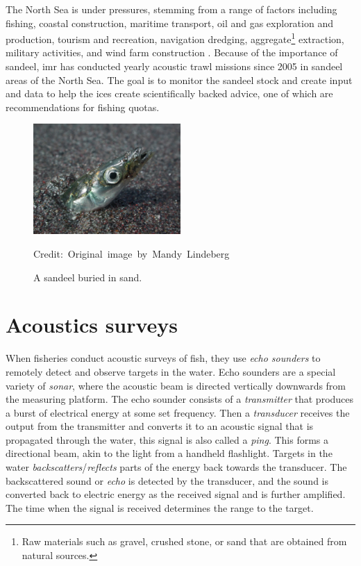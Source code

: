     The North Sea is under pressures, stemming from a range of factors including fishing, coastal construction, maritime transport, oil and gas exploration and production, tourism and recreation, navigation dredging, aggregate\footnote{Raw materials such as gravel, crushed stone, or sand that are obtained from natural sources.} extraction, military activities, and wind farm construction \cite{ICES2021}. Because of the importance of sandeel, \gls{imr} has conducted yearly acoustic trawl missions since 2005 in sandeel areas of the North Sea\cite{johnsen2017collective}. The goal is to monitor the sandeel stock and create input and data to help the \gls{ices} create scientifically backed advice, one of which are recommendations for fishing quotas\cite{sizedependentfreqrespons2009johnsen}. 
    
    \begin{figure}[H]
        \centering

        \includegraphics[width=0.5\textwidth]{figures/Ammodytes_hexapterus.jpg} 

        \caption[Sandeel]{A sandeel buried in sand.}
        \medskip 
        \hspace*{15pt}\hbox{\scriptsize Credit: Original image by Mandy Lindeberg\cite{sandeel_image}}
        \label{sandeel_image}
    \end{figure}



    
\section{Acoustics surveys}\label{acoustics}
    When fisheries conduct acoustic surveys of fish, they use \textit{echo sounders} to remotely detect and observe targets in the water. Echo sounders are a special variety of \textit{sonar}, where the acoustic beam is directed vertically downwards from the measuring platform. The echo sounder consists of a \textit{transmitter} that produces a burst of electrical energy at some set frequency. Then a \textit{transducer} receives the output from the transmitter and converts it to an acoustic signal that is propagated through the water, this signal is also called a \textit{ping}. This forms a directional beam, akin to the light from a handheld flashlight. Targets in the water \textit{backscatters}/\textit{reflects} parts of the energy back towards the transducer. The backscattered sound or \textit{echo} is detected by the transducer, and the sound is converted back to electric energy as the received signal and is further amplified. The time when the signal is received determines the range to the target\cite{simmonds2008fisheries}.
    
